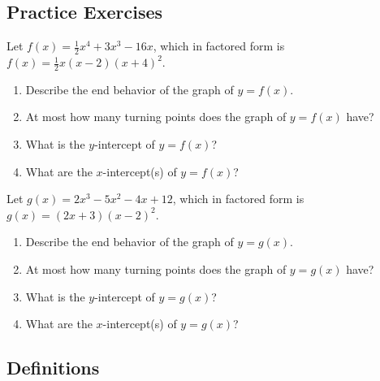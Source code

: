 


\newpage


\subsection*{Practice Exercises} \label{practice-functions-polynomial-long-term}


\begin{myPractice}
Let $f(x) = \frac{1}{2} x^4 +3x^3 -16x$, which in factored form is $f(x) = \frac{1}{2}x(x-2)(x+4)^2$.
	\begin{enumerate}
		\item Describe the end behavior of the graph of $y=f(x)$.
		\vfill

		\item At most how many turning points does the graph of $y=f(x)$ have?
		\vfill

		\item What is the $y$-intercept of $y=f(x)$?
		\vfill

		\item What are the $x$-intercept(s) of $y=f(x)$?
		\vfill
	\end{enumerate}
\end{myPractice}



\begin{myPractice}
Let $g(x) = 2x^3-5x^2-4x+12$, which in factored form is $g(x) = (2x+3)(x-2)^2$.
	\begin{enumerate}
		\item Describe the end behavior of the graph of $y=g(x)$.
		\vfill

		\item At most how many turning points does the graph of $y=g(x)$ have?
		\vfill

		\item What is the $y$-intercept of $y=g(x)$?
		\vfill

		\item What are the $x$-intercept(s) of $y=g(x)$?
		\vfill
	\end{enumerate}
\end{myPractice}



\newpage

\subsection*{Definitions} \label{def-functions-polynomial-long-term}


